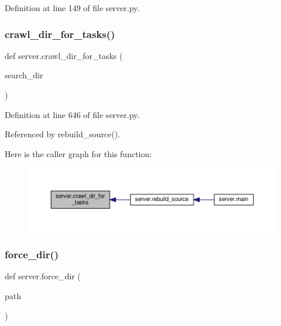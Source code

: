 Definition at line 149 of file server.\+py.

\mbox{\label{namespaceserver_ac31b8422e56c4f0bf9a35c5cc2234a42}} 
\subsubsection{\texorpdfstring{crawl\+\_\+dir\+\_\+for\+\_\+tasks()}{crawl\_dir\_for\_tasks()}}
{\footnotesize\ttfamily def server.\+crawl\+\_\+dir\+\_\+for\+\_\+tasks (\begin{DoxyParamCaption}\item[{}]{search\+\_\+dir }\end{DoxyParamCaption})}



Definition at line 646 of file server.\+py.



Referenced by rebuild\+\_\+source().

Here is the caller graph for this function\+:
\nopagebreak
\begin{figure}[H]
\begin{center}
\leavevmode
\includegraphics[width=350pt]{namespaceserver_ac31b8422e56c4f0bf9a35c5cc2234a42_icgraph}
\end{center}
\end{figure}
\mbox{\label{namespaceserver_a9ddf2e515b916af96b6e9e79894482ed}} 
\subsubsection{\texorpdfstring{force\+\_\+dir()}{force\_dir()}}
{\footnotesize\ttfamily def server.\+force\+\_\+dir (\begin{DoxyParamCaption}\item[{}]{path }\end{DoxyParamCaption})}

